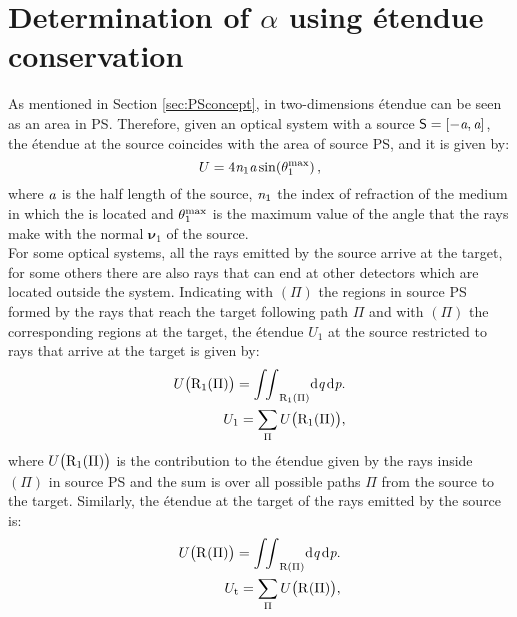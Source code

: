 \section{Determination of $\alpha$ using \'{e}tendue conservation} \label{sec:Tir_alpha}
As mentioned in Section \ref{sec:PSconcept}, in two-dimensions \'{e}tendue can be seen as an area in PS. 
Therefore, given an optical system with a source $\textsf{S} = [-\textit{a}, \textit{a}]$, the \'{e}tendue at the source coincides with the area of source PS, and it is given by:
\begin{equation}\label{eq:etenduesource1}
U = 4\textit{n}_1 \textit{a} \sin(\theta_1^{\textrm{max}})\,,
\end{equation}
 where $\textit{a}$ is the half length of the source, $\textit{n}_1$ the index of refraction of the medium in which the  is located and $\theta_1^{\textrm{max}}$ is the maximum value of the angle that the rays make with the normal $\boldsymbol{\nu}_1$ of the source.\\ \indent 
For some optical systems, all the rays emitted by the source arrive at the target, for some others there are also rays that can end at other detectors which are located outside the system. 
Indicating with $(\Pi)$ the regions in source PS formed by the rays that reach the target following path $\Pi$ and with $(\Pi)$ the corresponding regions at the target, the \'{e}tendue $U_1$ at the source restricted to rays that arrive at the target is given by:
\begin{subequations}
\begin{align}
\label{eq:etendueintegralsource}
U\big(\mbox{$\textup{R}_{\textit{$1$}}$}(\Pi)\big) = {\int\!\!\int}_{\textup{R}_1(\Pi)} \textrm{d}\textit{q}\,\textrm{d}\textit{p}.\\\label{eq:etenduesumsource}
U_1 = \sum_\Pi{U\big(\mbox{$\textup{R}_{\textit{$1$}}$}(\Pi)\big)}, 
\end{align}
\end{subequations}
where $U\big(\mbox{$\textup{R}_{\textit{$1$}}$}(\Pi)\big)$ is the contribution to the \'{e}tendue given by the rays inside 
$(\Pi)$ in source PS and the sum is over all possible paths $\Pi$ from the source to the target.
Similarly, the \'{e}tendue at the target of the rays emitted by the source is:
\begin{subequations}
\begin{align}
\label{eq:etendueintegraltarget}
U\big(\mbox{$\textup{R}_{\textit{}}$}(\Pi)\big) = {\int\!\!\int}_{\textup{R}(\Pi)} \textrm{d}\textit{q}\,\textrm{d}\textit{p}.\\ \label{eq:etenduesumtarget}
U_\textrm{t}= \sum_\Pi{U\big(\mbox{$\textup{R}_{\textit{}}$}(\Pi)\big)}, 
\end{align}
\end{subequations}
